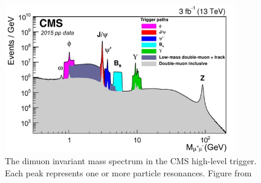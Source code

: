 \begin{figure}[ht]
	\label{fig:diMuonSpectrum}
	\centering
	\caption[Inclusive dimuon spectrum in CMS]{The dimuon invariant mass spectrum in the CMS high-level trigger. Each peak represents one or more particle resonances. Figure from \cite{cmsMuonPerformance}}
	\includegraphics[width=0.9\textwidth]{figures/cms_diMuonSpectrum.jpg}
\end{figure}



